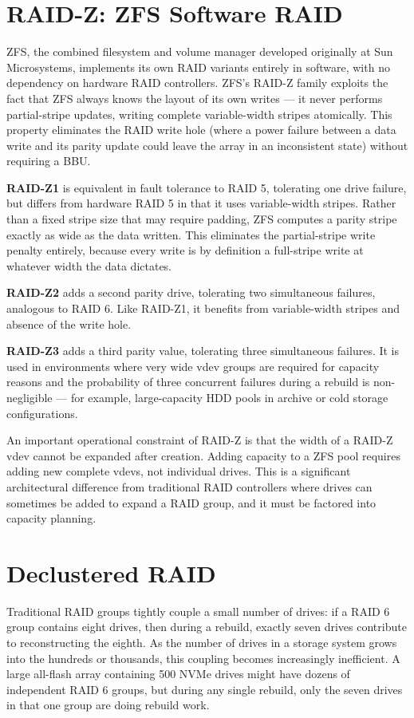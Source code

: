 \section{RAID-Z: ZFS Software RAID}
ZFS, the combined filesystem and volume manager developed originally at Sun Microsystems, implements its own RAID variants entirely in software, with no dependency on hardware RAID controllers. ZFS's RAID-Z family exploits the fact that ZFS always knows the layout of its own writes --- it never performs partial-stripe updates, writing complete variable-width stripes atomically. This property eliminates the RAID write hole (where a power failure between a data write and its parity update could leave the array in an inconsistent state) without requiring a BBU.

\textbf{RAID-Z1} is equivalent in fault tolerance to RAID 5, tolerating one drive failure, but differs from hardware RAID 5 in that it uses variable-width stripes. Rather than a fixed stripe size that may require padding, ZFS computes a parity stripe exactly as wide as the data written. This eliminates the partial-stripe write penalty entirely, because every write is by definition a full-stripe write at whatever width the data dictates.

\textbf{RAID-Z2} adds a second parity drive, tolerating two simultaneous failures, analogous to RAID 6. Like RAID-Z1, it benefits from variable-width stripes and absence of the write hole.

\textbf{RAID-Z3} adds a third parity value, tolerating three simultaneous failures. It is used in environments where very wide vdev groups are required for capacity reasons and the probability of three concurrent failures during a rebuild is non-negligible --- for example, large-capacity HDD pools in archive or cold storage configurations.

An important operational constraint of RAID-Z is that the width of a RAID-Z vdev cannot be expanded after creation. Adding capacity to a ZFS pool requires adding new complete vdevs, not individual drives. This is a significant architectural difference from traditional RAID controllers where drives can sometimes be added to expand a RAID group, and it must be factored into capacity planning.

\section{Declustered RAID}
Traditional RAID groups tightly couple a small number of drives: if a RAID 6 group contains eight drives, then during a rebuild, exactly seven drives contribute to reconstructing the eighth. As the number of drives in a storage system grows into the hundreds or thousands, this coupling becomes increasingly inefficient. A large all-flash array containing 500 NVMe drives might have dozens of independent RAID 6 groups, but during any single rebuild, only the seven drives in that one group are doing rebuild work.


